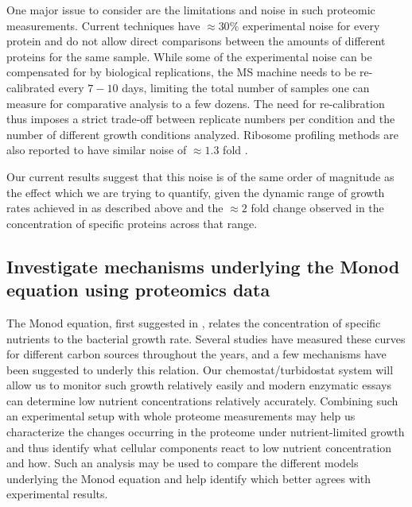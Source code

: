 \documentclass[notitlepage]{article}
\begin{document}
One major issue to consider are the limitations and noise in such proteomic measurements.
Current techniques have $\approx 30\%$ experimental noise for every protein and do not allow direct comparisons between the amounts of different proteins for the same sample.
While some of the experimental noise can be compensated for by biological replications, the MS machine needs to be re-calibrated every $7-10$ days, limiting the total number of samples one can measure for comparative analysis to a few dozens.
The need for re-calibration thus imposes a strict trade-off between replicate numbers per condition and the number of different growth conditions analyzed.
Ribosome profiling methods are also reported to have similar noise of $\approx 1.3$ fold \cite{Li2014}.

Our current results suggest that this noise is of the same order of magnitude as the effect which we are trying to quantify, given the dynamic range of growth rates achieved in \cite{Heinemann2014} as described above and the $\approx 2$ fold change observed in the concentration of specific proteins across that range. 

\subsection{Investigate mechanisms underlying the Monod equation using proteomics data}
The Monod equation, first suggested in \cite{Monod1949}, relates the concentration of specific nutrients to the bacterial growth rate.
Several studies have measured these curves for different carbon sources throughout the years, and a few mechanisms have been suggested to underly this relation.
Our chemostat/turbidostat system will allow us to monitor such growth relatively easily and modern enzymatic essays can determine low nutrient concentrations relatively accurately.
Combining such an experimental setup with whole proteome measurements may help us characterize the changes occurring in the proteome under nutrient-limited growth and thus identify what cellular components react to low nutrient concentration and how.
Such an analysis may be used to compare the different models underlying the Monod equation and help identify which better agrees with experimental results.
\end{document}
